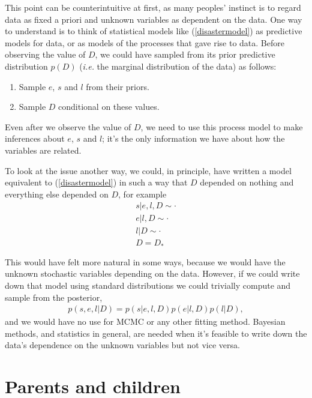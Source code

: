 This point can be counterintuitive at first, as many peoples' instinct is to regard data as fixed a priori and unknown variables as dependent on the data. One way to understand is to think of statistical models like (\ref{disastermodel}) as predictive models for data, or as models of the processes that gave rise to data. Before observing the value of $D$, we could have sampled from its prior predictive distribution $p(D)$ (\emph{i.e.} the marginal distribution of the data) as follows:
\begin{enumerate}
    \item Sample $e$, $s$ and $l$ from their priors.
    \item Sample $D$ conditional on these values.
\end{enumerate}
Even after we observe the value of $D$, we need to use this process model to make inferences about $e$, $s$ and $l$; it's the only information we have about how the variables are related.

\medskip
To look at the issue another way, we could, in principle, have written a model equivalent to (\ref{disastermodel}) in such a way that $D$ depended on nothing and everything else depended on $D$, for example
\begin{eqnarray*}
    s|e,l,D\sim\cdot\\
    e|l,D\sim\cdot\\
    l|D\sim\cdot\\
    D=D_*
\end{eqnarray*}

This would have felt more natural in some ways, because we would have the unknown stochastic variables depending on the data. However, if we could write down that model using standard distributions we could trivially compute and sample from the posterior,
\begin{eqnarray*}
    p(s,e,l|D) = p(s|e, l, D) p(e|l, D) p(l|D),
\end{eqnarray*}
and we would have no use for MCMC or any other fitting method. Bayesian methods, and statistics in general, are needed when it's feasible to write down the data's dependence on the unknown variables but not vice versa.


\section*{Parents and children}


